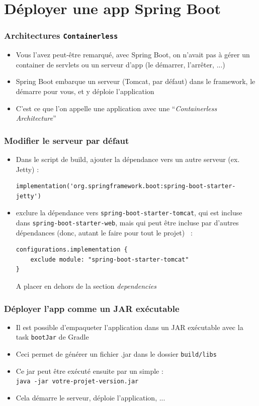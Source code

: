 \documentclass{beamer}
\begin{document}
\section{Déployer une app Spring Boot}

\begin{frame}[fragile]
	\frametitle{Architectures \texttt{Containerless}}
	\begin{itemize}
		\item Vous l'avez peut-être remarqué, avec Spring Boot, on n'avait pas à gérer un container de servlets ou un serveur d'app (le démarrer, l'arrêter, ...)
		\item Spring Boot embarque un serveur (Tomcat, par défaut) dans le framework, le démarre pour vous, et y déploie l'application
		\item C'est ce que l'on appelle une application avec une ``\textit{Containerless Architecture}''
	\end{itemize}
\end{frame}

\begin{frame}[fragile]
	\frametitle{Modifier le serveur par défaut}
	\begin{itemize}
		\item Dans le script de build, ajouter la dépendance vers un autre serveur (ex. Jetty) :
\begin{lstlisting}
implementation('org.springframework.boot:spring-boot-starter-jetty')
\end{lstlisting}
		\item exclure la dépendance vers \texttt{spring-boot-starter-tomcat}, qui est incluse dans \texttt{spring-boot-starter-web}, mais qui peut être incluse par d'autres dépendances (donc, autant le faire pour tout le projet) ~:
\begin{lstlisting}
configurations.implementation {
	exclude module: "spring-boot-starter-tomcat"
}
\end{lstlisting}
		A placer en dehors de la section \textit{dependencies}		
	\end{itemize}
\end{frame}

\begin{frame}
	\frametitle{Déployer l'app comme un JAR exécutable}
	\begin{itemize}
		\item Il est possible d'empaqueter l'application dans un JAR exécutable avec la task \texttt{bootJar} de Gradle
		\item Ceci permet de générer un fichier .jar dans le dossier \texttt{build/libs}
		\item Ce jar peut être exécuté ensuite par un simple :\\ \texttt{java -jar votre-projet-version.jar}
		\item Cela démarre le serveur, déploie l'application, ...
	\end{itemize}
\end{frame} 
\end{document}
